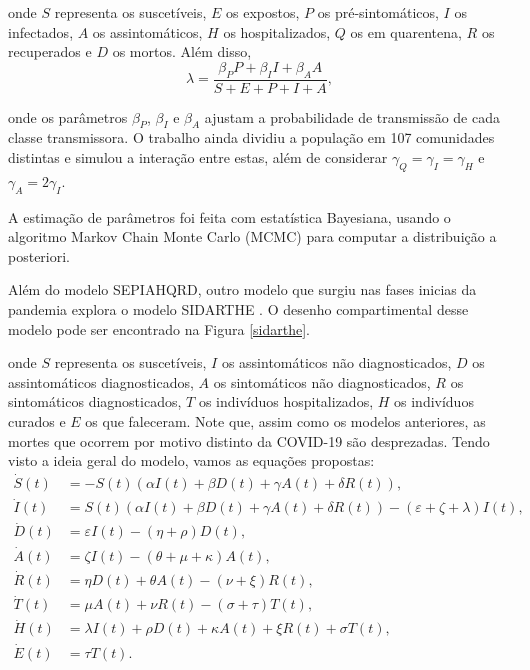 \documentclass{article}
\begin{document}
\noindent onde $S$ representa os suscetíveis, $E$ os expostos, $P$ os pré-sintomáticos, $I$ os infectados, $A$ os assintomáticos, $H$ os hospitalizados, $Q$ os em quarentena, $R$ os recuperados e $D$ os mortos. Além disso, 
\[\lambda = \frac{\beta_P P + \beta_I I + \beta_A A}{S + E + P + I + A},\]

\noindent onde os parâmetros $\beta_P$, $\beta_I$ e $\beta_A$ ajustam a probabilidade de transmissão de cada classe transmissora. O trabalho ainda dividiu a população em 107 comunidades distintas e simulou a interação entre estas, além de considerar $\gamma_Q = \gamma_I = \gamma_H$ e $\gamma_A = 2\gamma_I$.

A estimação de parâmetros foi feita com estatística Bayesiana, usando o algoritmo Markov Chain Monte Carlo (MCMC) para computar a distribuição a posteriori.

Além do modelo SEPIAHQRD, outro modelo que surgiu nas fases inicias da pandemia explora o modelo SIDARTHE \cite{JOUR}. O desenho compartimental desse modelo pode ser encontrado na Figura \ref{sidarthe}.

\noindent onde $S$ representa os suscetíveis, $I$ os assintomáticos não diagnosticados, $D$ os assintomáticos diagnosticados, $A$ os sintomáticos não diagnosticados, $R$ os sintomáticos diagnosticados, $T$ os indivíduos hospitalizados, $H$ os indivíduos curados e $E$ os que faleceram. Note que, assim como os modelos anteriores, as mortes que ocorrem por motivo distinto da COVID-19 são desprezadas. Tendo visto a ideia geral do modelo, vamos as equações propostas:
\begin{equation*}
    \begin{split}
        \dot{S}(t) & = -S(t)(\alpha I(t) + \beta D(t) + \gamma A(t) + \delta R(t)),\\
        \dot{I}(t) & = S(t)(\alpha I(t) + \beta D(t) + \gamma A(t) + \delta R(t)) - (\varepsilon + \zeta + \lambda)I(t), \\
        \dot{D}(t) & = \varepsilon I(t) - (\eta + \rho)D(t), \\
        \dot{A}(t) & = \zeta I(t) - (\theta + \mu + \kappa)A(t), \\
        \dot{R}(t) & = \eta D(t) + \theta A(t) - (\nu + \xi)R(t), \\
        \dot{T}(t) & = \mu A(t) + \nu R(t) - (\sigma + \tau)T(t), \\
        \dot{H}(t) & = \lambda I(t) + \rho D(t) + \kappa A(t) + \xi R(t) + \sigma T(t), \\
        \dot{E}(t) & = \tau T(t).
    \end{split}
\end{equation*}
\end{document}
